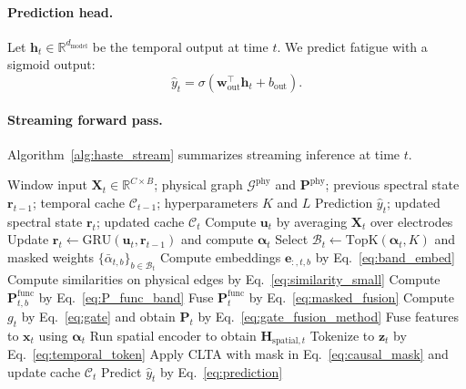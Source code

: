\documentclass[preprint,12pt]{elsarticle}
\begin{document}
\paragraph{Prediction head.}
Let $\mathbf{h}_t\in\mathbb{R}^{d_{\mathrm{model}}}$ be the temporal output at time $t$.
We predict fatigue with a sigmoid output:
\begin{equation}
\hat{y}_t
=
\sigma(\mathbf{w}_{\mathrm{out}}^{\top}\mathbf{h}_t + b_{\mathrm{out}}).
\label{eq:prediction}
\end{equation}

\paragraph{Streaming forward pass.}
Algorithm~\ref{alg:haste_stream} summarizes streaming inference at time $t$.

\begin{algorithm}[!t]
\caption{Streaming inference of HASTE at time $t$}
\label{alg:haste_stream}
\begin{algorithmic}
\Require Window input $\mathbf{X}_t\in\mathbb{R}^{C\times B}$; physical graph $\mathcal{G}^{\mathrm{phy}}$ and $\mathbf{P}^{\mathrm{phy}}$;
previous spectral state $\mathbf{r}_{t-1}$; temporal cache $\mathcal{C}_{t-1}$; hyperparameters $K$ and $L$
\Ensure Prediction $\hat{y}_t$; updated spectral state $\mathbf{r}_{t}$; updated cache $\mathcal{C}_{t}$
\State Compute $\mathbf{u}_t$ by averaging $\mathbf{X}_t$ over electrodes
\State Update $\mathbf{r}_t\leftarrow \mathrm{GRU}(\mathbf{u}_t,\mathbf{r}_{t-1})$ and compute $\boldsymbol{\alpha}_t$
\State Select $\mathcal{B}_t\leftarrow \mathrm{TopK}(\boldsymbol{\alpha}_t,K)$ and masked weights $\{\bar{\alpha}_{t,b}\}_{b\in\mathcal{B}_t}$
\State Compute embeddings $\mathbf{e}_{:,t,b}$ by Eq.~\eqref{eq:band_embed}
\State Compute similarities on physical edges by Eq.~\eqref{eq:similarity_small}
\State Compute $\mathbf{P}^{\mathrm{func}}_{t,b}$ by Eq.~\eqref{eq:P_func_band}
\EndFor
\State Fuse $\mathbf{P}^{\mathrm{func}}_t$ by Eq.~\eqref{eq:masked_fusion}
\State Compute $g_t$ by Eq.~\eqref{eq:gate} and obtain $\mathbf{P}_t$ by Eq.~\eqref{eq:gate_fusion_method}
\State Fuse features to $\mathbf{x}_t$ using $\boldsymbol{\alpha}_t$
\State Run spatial encoder to obtain $\mathbf{H}_{\mathrm{spatial},t}$
\State Tokenize to $\mathbf{z}_t$ by Eq.~\eqref{eq:temporal_token}
\State Apply CLTA with mask in Eq.~\eqref{eq:causal_mask} and update cache $\mathcal{C}_t$
\State Predict $\hat{y}_t$ by Eq.~\eqref{eq:prediction}
\end{algorithmic}
\end{algorithm}
\end{document}
